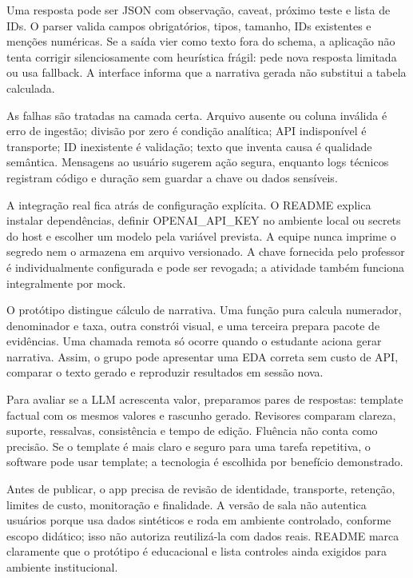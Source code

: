 Uma resposta pode ser JSON com observação, caveat, próximo teste e lista de IDs. O parser valida campos obrigatórios, tipos, tamanho, IDs existentes e menções numéricas. Se a saída vier como texto fora do schema, a aplicação não tenta corrigir silenciosamente com heurística frágil: pede nova resposta limitada ou usa fallback. A interface informa que a narrativa gerada não substitui a tabela calculada.

As falhas são tratadas na camada certa. Arquivo ausente ou coluna inválida é erro de ingestão; divisão por zero é condição analítica; API indisponível é transporte; ID inexistente é validação; texto que inventa causa é qualidade semântica. Mensagens ao usuário sugerem ação segura, enquanto logs técnicos registram código e duração sem guardar a chave ou dados sensíveis.

A integração real fica atrás de configuração explícita. O README explica instalar dependências, definir OPENAI\_API\_KEY no ambiente local ou secrets do host e escolher um modelo pela variável prevista. A equipe nunca imprime o segredo nem o armazena em arquivo versionado. A chave fornecida pelo professor é individualmente configurada e pode ser revogada; a atividade também funciona integralmente por mock.

O protótipo distingue cálculo de narrativa. Uma função pura calcula numerador, denominador e taxa, outra constrói visual, e uma terceira prepara pacote de evidências. Uma chamada remota só ocorre quando o estudante aciona gerar narrativa. Assim, o grupo pode apresentar uma EDA correta sem custo de API, comparar o texto gerado e reproduzir resultados em sessão nova.

Para avaliar se a LLM acrescenta valor, preparamos pares de respostas: template factual com os mesmos valores e rascunho gerado. Revisores comparam clareza, suporte, ressalvas, consistência e tempo de edição. Fluência não conta como precisão. Se o template é mais claro e seguro para uma tarefa repetitiva, o software pode usar template; a tecnologia é escolhida por benefício demonstrado.

Antes de publicar, o app precisa de revisão de identidade, transporte, retenção, limites de custo, monitoração e finalidade. A versão de sala não autentica usuários porque usa dados sintéticos e roda em ambiente controlado, conforme escopo didático; isso não autoriza reutilizá-la com dados reais. README marca claramente que o protótipo é educacional e lista controles ainda exigidos para ambiente institucional.



